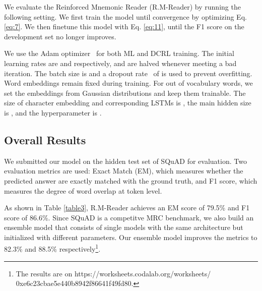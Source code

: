 \documentclass{article}
\begin{document}
We evaluate the Reinforced Mnemonic Reader (R.M-Reader) by running the following setting. We first train the model until convergence by optimizing Eq. \ref{eq:7}. We then finetune this model with Eq. \ref{eq:11}, until the F1 score on the development set no longer improves.

We use the Adam optimizer~\cite{Kingma14} for both ML and DCRL training. The initial learning rates are  and  respectively, and are halved whenever meeting a bad iteration. The batch size is  and a dropout rate~\cite{Srivastava14} of  is used to prevent overfitting. Word embeddings remain fixed during training. For out of vocabulary words, we set the embeddings from Gaussian distributions and keep them trainable. The size of character embedding and corresponding LSTMs is , the main hidden size is , and the hyperparameter  is .


\subsection{Overall Results}
We submitted our model on the hidden test set of SQuAD for evaluation. 
Two evaluation metrics are used: Exact Match (EM), which measures whether the predicted answer are exactly matched with the ground truth, and F1 score, which measures the degree of word overlap at token level. 

As shown in Table \ref{table3}, R.M-Reader achieves an EM score of 79.5\% and F1 score of 86.6\%. Since SQuAD is a competitve MRC benchmark, we also build an ensemble model that consists of  single models with the same architecture but initialized with different parameters. Our ensemble model improves the metrics to 82.3\% and 88.5\% respectively\footnote{The results are on https://worksheets.codalab.org/worksheets/ 0xe6c23cbae5e440b8942f86641f49fd80.}.
\end{document}
